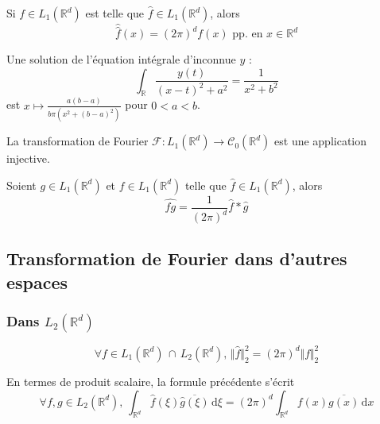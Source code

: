   \begin{theorem}
    Si $f \in L_1(\mathbb{R}^d)$ est telle que $\widehat{f} \in L_1(\mathbb{R}^d)$, alors
    \[ \widehat{\widehat{f}}(x) = (2\pi)^d f(x) \text{ pp. en } x \in \mathbb{R}^d \]
  \end{theorem}

  \begin{example}
    Une solution de l'équation intégrale d'inconnue $y$ :
    \[ \int_{\mathbb{R}} \frac{y(t)}{(x-t)^2 + a^2} = \frac{1}{x^2 + b^2} \]
    est $x \mapsto \frac{a(b-a)}{b \pi (x^2 + (b-a)^2)}$ pour $0 < a < b$.
  \end{example}

  \begin{corollary}
    La transformation de Fourier $\mathcal{F} : L_1(\mathbb{R}^d) \rightarrow \mathcal{C}_0(\mathbb{R}^d)$ est une application injective.
  \end{corollary}

  \begin{proposition}
    Soient $g \in L_1(\mathbb{R}^d)$ et $f \in L_1(\mathbb{R}^d)$ telle que $\widehat{f} \in L_1(\mathbb{R}^d)$, alors
    \[ \widehat{fg} = \frac{1}{(2\pi)^d} \widehat{f} * \widehat{g} \]
  \end{proposition}

  \subsection{Transformation de Fourier dans d'autres espaces}

  \subsubsection{Dans \texorpdfstring{$L_2(\mathbb{R}^d)$}{L₂(Rᵈ)}}


  \begin{theorem}
    \[ \forall f \in L_1(\mathbb{R}^d) \, \cap \, L_2(\mathbb{R}^d), \, \Vert \widehat{f} \Vert^2_2 = (2 \pi)^d \Vert f \Vert^2_2 \]
  \end{theorem}

  \begin{remark}
    En termes de produit scalaire, la formule précédente s'écrit
    \[ \forall f, g \in L_2(\mathbb{R}^d), \, \int_{\mathbb{R}^d} \widehat{f}(\xi) \overline{\widehat{g}(\xi)} \, \mathrm{d}\xi = (2 \pi)^d \int_{\mathbb{R}^d} f(x) \overline{g(x)} \, \mathrm{d}x \]
  \end{remark}

